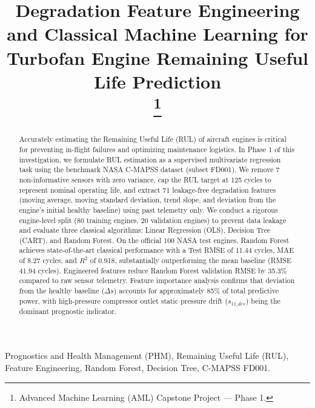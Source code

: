 \documentclass[conference]{IEEEtran}
\begin{document}
\title{Degradation Feature Engineering and Classical Machine Learning for Turbofan Engine Remaining Useful Life Prediction\\
\thanks{Advanced Machine Learning (AML) Capstone Project --- Phase 1.}
}

\author{
}

\maketitle

\begin{abstract}
Accurately estimating the Remaining Useful Life (RUL) of aircraft engines is critical for preventing in-flight failures and optimizing maintenance logistics. In Phase 1 of this investigation, we formulate RUL estimation as a supervised multivariate regression task using the benchmark NASA C-MAPSS dataset (subset FD001). We remove 7 non-informative sensors with zero variance, cap the RUL target at 125 cycles to represent nominal operating life, and extract 71 leakage-free degradation features (moving average, moving standard deviation, trend slope, and deviation from the engine's initial healthy baseline) using past telemetry only. We conduct a rigorous engine-level split (80 training engines, 20 validation engines) to prevent data leakage and evaluate three classical algorithms: Linear Regression (OLS), Decision Tree (CART), and Random Forest. On the official 100 NASA test engines, Random Forest achieves state-of-the-art classical performance with a Test RMSE of 11.44 cycles, MAE of 8.27 cycles, and $R^2$ of 0.918, substantially outperforming the mean baseline (RMSE 41.94 cycles). Engineered features reduce Random Forest validation RMSE by 35.3\% compared to raw sensor telemetry. Feature importance analysis confirms that deviation from the healthy baseline ($\Delta s$) accounts for approximately 85\% of total predictive power, with high-pressure compressor outlet static pressure drift ($s_{11\_dev}$) being the dominant prognostic indicator.
\end{abstract}

\begin{IEEEkeywords}
Prognostics and Health Management (PHM), Remaining Useful Life (RUL), Feature Engineering, Random Forest, Decision Tree, C-MAPSS FD001.
\end{IEEEkeywords}
\end{document}

